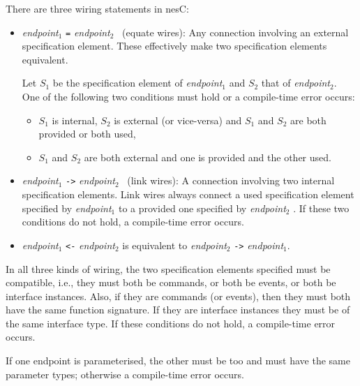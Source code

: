 \documentclass[11pt,letterpaper]{article}
\newcommand{\code}[1]{{\tt #1}}
\newcommand{\nesc}{nesC\xspace}
\begin{document}
There are three wiring statements in \nesc:
\begin{itemize}
\item \emph{endpoint}$_1$ \code{=} \emph{endpoint}$_2$ \ (equate wires):
Any connection involving an external specification element. These
effectively make two specification elements equivalent.

Let $S_1$ be the specification element of \emph{endpoint}$_1$ and $S_2$
that of \emph{endpoint}$_2$. One of the following two conditions must hold
or a compile-time error occurs:
\begin{itemize}
\item $S_1$ is internal, $S_2$ is external (or vice-versa) and $S_1$ and
$S_2$ are both provided or both used,
\item $S_1$ and $S_2$ are both external and one is provided and the other used.
\end{itemize}

\item \emph{endpoint}$_1$ \code{->} \emph{endpoint}$_2$ \ (link wires): A
connection involving two internal specification elements. Link wires always
connect a used specification element specified by \emph{endpoint}$_1$ to a
provided one specified by \emph{endpoint}$_2$ . If these two conditions do
not hold, a compile-time error occurs.

\item \emph{endpoint}$_1$ \code{<-} \emph{endpoint}$_2$ is equivalent to
\emph{endpoint}$_2$ \code{->} \emph{endpoint}$_1$.
\end{itemize}

In all three kinds of wiring, the two specification elements specified must
be compatible, i.e., they must both be commands, or both be events, or both
be interface instances. Also, if they are commands (or events), then they
must both have the same function signature. If they are interface instances
they must be of the same interface type. If these conditions do not hold,
a compile-time error occurs.

If one endpoint is parameterised, the other must be too and must have the
same parameter types; otherwise a compile-time error occurs.
\end{document}
